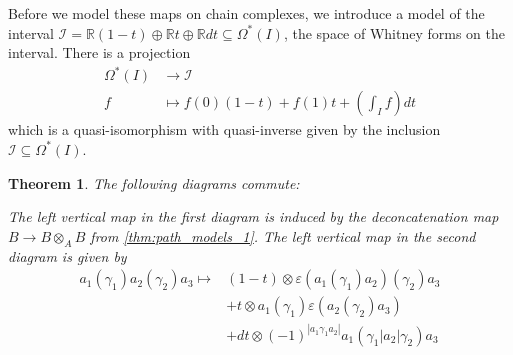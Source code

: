 \documentclass{scrartcl}
\theoremstyle{plain}
\newtheorem{theorem}{Theorem}[section]
\theoremstyle{definition}
\newtheorem{remark}[theorem]{Remark}
\newcommand{\R}{\mathbb R}
\newcommand{\Z}{\mathbb Z}
\newcommand{\abs}[1]{\left\lvert#1\right\rvert}
\renewcommand{\subset}{\subseteq}
\DeclareMathOperator{\Map}{Map}
\begin{document}

Before we model these maps on chain complexes, we introduce a model of the interval $\mathcal I = \R (1-t) \oplus \R t \oplus \R dt\subset \Omega^*(I)$, the space of Whitney forms on the interval. There is a projection 
\begin{align*}
    \Omega^*(I) &\to \mathcal I\\
    f&\mapsto f(0)(1-t) + f(1) t + \left(\int_I f\right) dt
\end{align*}
which is a quasi-isomorphism with quasi-inverse given by the inclusion $\mathcal I \subset \Omega^*(I)$. 


\begin{theorem}
    The following diagrams commute:


    \qquad
    
    The left vertical map in the first diagram is induced by the deconcatenation map $B\to B\otimes_A B$ from \ref{thm:path_models_1}. The left vertical map in the second diagram is given by 
    \begin{align*}
        a_1(\gamma_1)a_2(\gamma_2)a_3 \mapsto &(1-t)\otimes \varepsilon(a_1(\gamma_1)a_2)(\gamma_2)a_3 \\&+ t\otimes a_1(\gamma_1)\varepsilon(a_2(\gamma_2)a_3) \\&+ dt\otimes (-1)^{\abs{a_1\gamma_1a_2}}a_1(\gamma_1|a_2|\gamma_2)a_3
    \end{align*}
\end{theorem}
\end{document}
